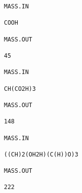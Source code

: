 \begin{verbatim}
MASS.IN

COOH

MASS.OUT

45
 
MASS.IN

CH(CO2H)3

MASS.OUT

148
 
MASS.IN

((CH)2(OH2H)(C(H))O)3

MASS.OUT

222
 

\end{verbatim}